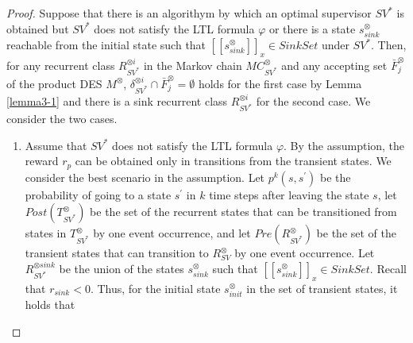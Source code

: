 \documentclass[10pt]{article}
\theoremstyle{definition}
\newcommand{\myspqsink}{\ensuremath{[\![s^{\otimes}_{sink}]\!]}_x}
\begin{document}
\begin{proof}
  Suppose that there is an algorithym by which an optimal supervisor $SV^{\ast}$ is obtained but $SV^{\ast}$ does not satisfy the LTL formula $\varphi$ or there is  a state $s^{\otimes}_{sink}$ reachable from the initial state such that $\myspqsink \in SinkSet$ under $SV^{\ast}$. Then, for any recurrent class $R^{\otimes i}_{{SV}^{\ast}}$ in the Markov chain $MC^{\otimes}_{{SV}^{\ast}}$ and any accepting set $\bar{F}^{\otimes}_j$ of the product DES $M^{\otimes}$,  $\delta^{\otimes i}_{SV^{\ast}} \cap \bar{F}^{\otimes}_j = \emptyset$
  holds for the first case by Lemma \ref{lemma3-1} and there is a sink recurrent class $R^{\otimes i}_{SV^{\ast}}$ for the second case. We consider the two cases.

 \begin{enumerate}
  \item Assume that $SV^{\ast}$ does not satisfy the LTL formula $\varphi$.
  By the assumption, the reward $r_p$ can be obtained only in transitions from the transient states. We consider the best scenario in the assumption. Let $p^k(s,s^{\prime})$ be the probability of going to a state $s^{\prime}$ in $k$ time steps after leaving the state $s$, let $Post(T^{\otimes}_{SV^{\ast}})$ be the set of the recurrent states that can be transitioned from states in $T^{\otimes}_{SV^{\ast}}$ by one event occurrence, and let $Pre(R^{\otimes}_{SV^{\ast}})$ be the set of the transient states that can transition to $R^{\otimes}_{SV}$ by one event occurrence. Let $R^{\otimes sink}_{SV^{\ast}}$ be the union of the states $s^{\otimes}_{sink}$ such that $\myspqsink \in SinkSet$. Recall that $r_{sink} < 0$. Thus, for the initial state $s^{\otimes}_{init}$ in the set of transient states, it holds that


\end{enumerate}
\end{proof}
\end{document}

